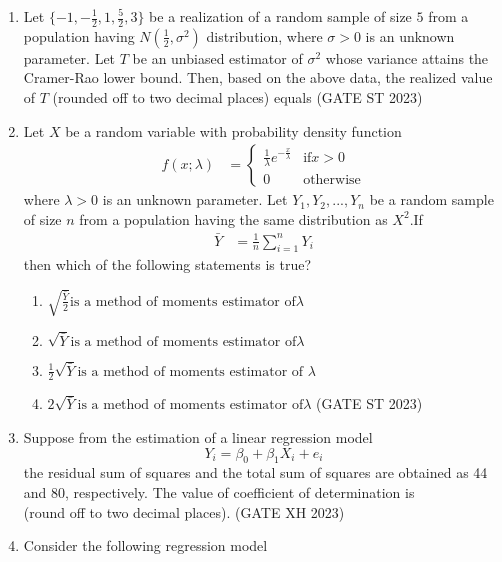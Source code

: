 \begin{enumerate}[label=\thechapter.\arabic*,ref=\thechapter.\theenumi]
\item Let $\{-1, -\frac{1}{2}, 1, \frac{5}{2}, 3\}$ be a realization of a random sample of size $5$ from a population having $N\left(\frac{1}{2}, \sigma^2\right)$ distribution, where $\sigma > 0$ is an unknown parameter. Let $T$ be an unbiased estimator of $\sigma^2$ whose variance attains the Cramer-Rao lower bound. Then, based on the above data, the realized value of $T$ (rounded off to two decimal places) equals
\hfill (GATE ST 2023)

\item Let $X$ be a random variable with probability density function
\begin{align}
\label{eq:22/2023/1}f(x;\lambda)&=
\begin{cases}
\frac{1}{\lambda}e^{-\frac{x}{\lambda}} & \text{if} x>0\\
0 & \text{otherwise}
\end{cases}
\end{align}
where $\lambda > 0$ is an unknown parameter. Let $Y_1, Y_2,...,Y_n$ be a random sample of
size $n$ from a population having the same distribution as $X^2$.If
\begin{align}
\label{eq:22/2023/2}\bar{Y} &= \frac{1}{n}\sum_{i=1}^n Y_i
\end{align}
then which of the following statements is true?
\begin{enumerate}
\item \label{eq:22/2023/3}$\sqrt{\frac{\bar{Y}}{2}} \text{is a method of moments estimator of}         \lambda$
\item $\sqrt{\bar{Y}} \text{is a method of moments estimator of}\lambda$
\item ${\frac{1}{2}\sqrt{\bar{Y}}} \text{is a method of moments estimator of }\lambda$
\item $2\sqrt{\bar{Y}} \text{is a method of moments estimator of} \lambda$
\hfill(GATE ST 2023)\\
\end{enumerate}

\item Suppose from the estimation of a linear regression model
$$Y_i=\beta_0+\beta_1X_i+e_i$$
the residual sum of squares and the total sum of squares are obtained as 44 and 80, respectively. The value of coefficient of determination is \\ (round off to two decimal places).
\hfill (GATE XH 2023)

\item  Consider the following regression model

\end{enumerate}
